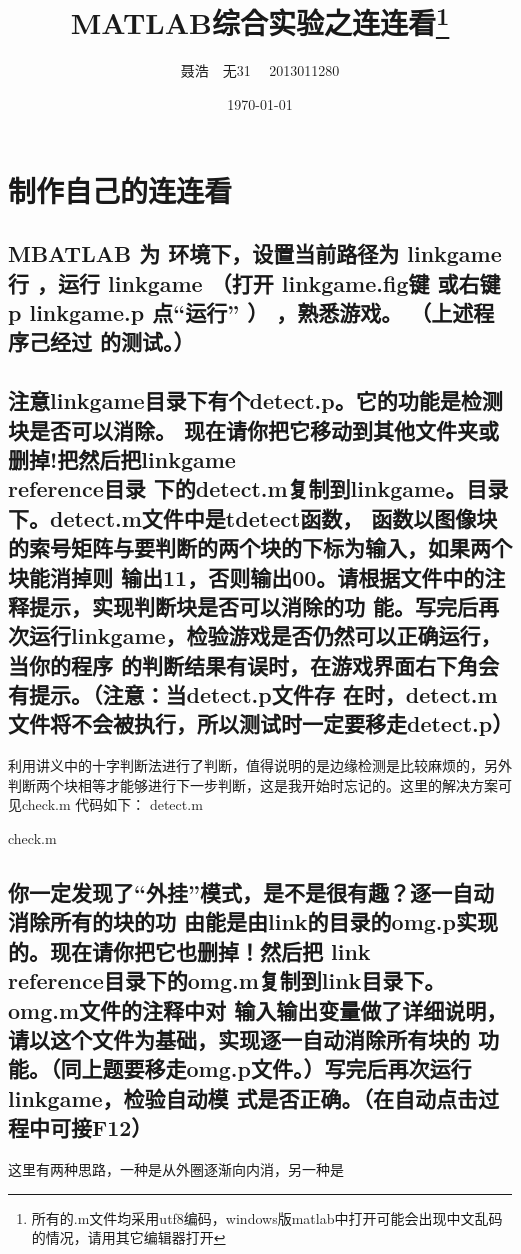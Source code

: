 \documentclass{ctexart}
\title{MATLAB综合实验之连连看\footnote{所有的.m文件均采用utf8编码，windows版matlab中打开可能会出现中文乱码的情况，请用其它编辑器打开}}
\author{聂浩~~无31~~ 2013011280}
\date{\today}
\begin{document}
\maketitle
\section{制作自己的连连看}
\subsection{
MBATLAB 为 环境下，设置当前路径为  linkgame行 ，运行  linkgame （打开
linkgame.fig键 或右键 p linkgame.p  点“运行” ） ，熟悉游戏。 （上述程序己经过
的测试。）}
\subsection{
注意linkgame目录下有个detect.p。它的功能是检测块是否可以消除。
现在请你把它移动到其他文件夹或删掉!把然后把linkgame\\reference目录
下的detect.m复制到linkgame。目录下。detect.m文件中是tdetect函数，
函数以图像块的索号矩阵与要判断的两个块的下标为输入，如果两个块能消掉则
输出11，否则输出00。请根据文件中的注释提示，实现判断块是否可以消除的功
能。写完后再次运行linkgame，检验游戏是否仍然可以正确运行，当你的程序
的判断结果有误时，在游戏界面右下角会有提示。（注意：当detect.p文件存
在时，detect.m文件将不会被执行，所以测试时一定要移走detect.p）}
利用讲义中的十字判断法进行了判断，值得说明的是边缘检测是比较麻烦的，另外判断两个块相等才能够进行下一步判断，这是我开始时忘记的。这里的解决方案可见check.m
代码如下：
detect.m

check.m

\subsection{
你一定发现了“外挂”模式，是不是很有趣？逐一自动消除所有的块的功
由能是由link的目录的omg.p实现的。现在请你把它也删掉！然后把
link\\reference目录下的omg.m复制到link目录下。omg.m文件的注释中对
输入输出变量做了详细说明，请以这个文件为基础，实现逐一自动消除所有块的
功能。（同上题要移走omg.p文件。）写完后再次运行linkgame，检验自动模
式是否正确。（在自动点击过程中可接F12）
}
这里有两种思路，一种是从外圈逐渐向内消，另一种是
\end{document}
